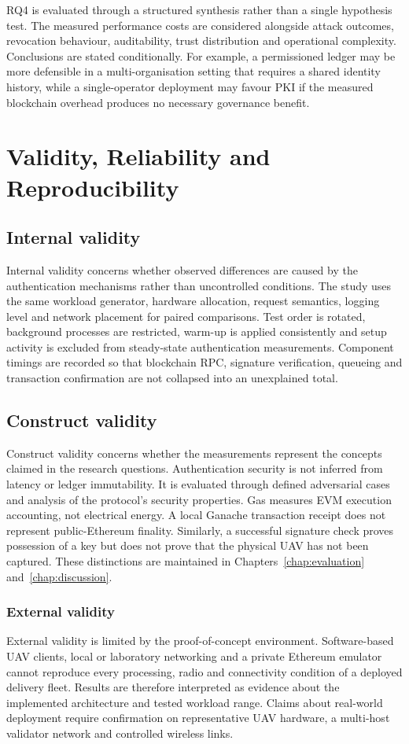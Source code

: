 RQ4 is evaluated through a structured synthesis rather than a single hypothesis test. The measured performance costs are considered alongside attack outcomes, revocation behaviour, auditability, trust distribution and operational complexity. Conclusions are stated conditionally. For example, a permissioned ledger may be more defensible in a multi-organisation setting that requires a shared identity history, while a single-operator deployment may favour PKI if the measured blockchain overhead produces no necessary governance benefit.

\section{Validity, Reliability and Reproducibility}
\label{sec:validity-reliability}

\subsection{Internal validity}
Internal validity concerns whether observed differences are caused by the authentication mechanisms rather than uncontrolled conditions. The study uses the same workload generator, hardware allocation, request semantics, logging level and network placement for paired comparisons. Test order is rotated, background processes are restricted, warm-up is applied consistently and setup activity is excluded from steady-state authentication measurements. Component timings are recorded so that blockchain RPC, signature verification, queueing and transaction confirmation are not collapsed into an unexplained total.
\subsection{Construct validity}
Construct validity concerns whether the measurements represent the concepts claimed in the research questions. Authentication security is not inferred from latency or ledger immutability. It is evaluated through defined adversarial cases and analysis of the protocol's security properties. Gas measures EVM execution accounting, not electrical energy. A local Ganache transaction receipt does not represent public-Ethereum finality. Similarly, a successful signature check proves possession of a key but does not prove that the physical UAV has not been captured. These distinctions are maintained in Chapters~\ref{chap:evaluation} and~\ref{chap:discussion}.

\subsubsection{External validity} 
External validity is limited by the proof-of-concept environment. Software-based UAV clients, local or laboratory networking and a private Ethereum emulator cannot reproduce every processing, radio and connectivity condition of a deployed delivery fleet. Results are therefore interpreted as evidence about the implemented architecture and tested workload range. Claims about real-world deployment require confirmation on representative UAV hardware, a multi-host validator network and controlled wireless links.

